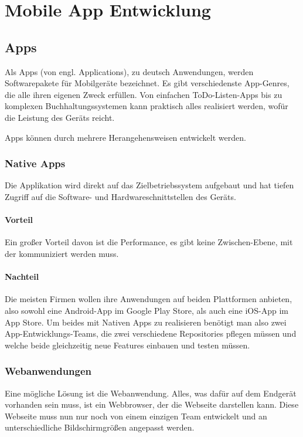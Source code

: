 \chapter{Mobile App Entwicklung}
\label{mobiledev}

\section{Apps}
Als Apps (von engl. Applications), zu deutsch Anwendungen, werden Softwarepakete für Mobilgeräte
bezeichnet. Es gibt verschiedenste App-Genres, die alle ihren eigenen Zweck erfüllen.
Von einfachen ToDo-Listen-Apps bis zu komplexen Buchhaltungssystemen kann praktisch alles realisiert
werden, wofür die Leistung des Geräts reicht.

Apps können durch mehrere Herangehensweisen entwickelt werden.

\subsection{Native Apps}
Die Applikation wird direkt auf das Zielbetriebssystem aufgebaut und hat tiefen Zugriff auf die
Software- und Hardwareschnittstellen des Geräts.

\subsubsection{Vorteil}
Ein großer Vorteil davon ist die Performance, es gibt keine Zwischen-Ebene, mit der kommuniziert
werden muss.

\subsubsection{Nachteil}
Die meisten Firmen wollen ihre Anwendungen auf beiden Plattformen anbieten, also sowohl eine
Android-App im Google Play Store, als auch eine iOS-App im App Store. Um beides mit Nativen Apps
zu realisieren benötigt man also zwei App-Entwicklungs-Teams, die zwei verschiedene Repositories
pflegen müssen und welche beide gleichzeitig neue Features einbauen und testen müssen.

\subsection{Webanwendungen}
Eine mögliche Lösung ist die Webanwendung. Alles, was dafür auf dem Endgerät vorhanden sein muss,
ist ein Webbrowser, der die Webseite darstellen kann. Diese Webseite muss nun nur noch von einem
einzigen Team entwickelt und an unterschiedliche Bildschirmgrößen angepasst werden.

